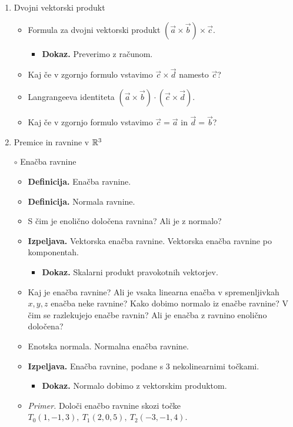 \begin{enumerate}
    \item Dvojni vektorski produkt
    \begin{itemize}
        \item Formula za dvojni vektorski produkt $(\vec{a} \times \vec{b}) \times \vec{c}$.
        \begin{itemize}
            \item \colorbox{green!30}{\textbf{Dokaz.}} Preverimo z računom.
        \end{itemize}
        \item Kaj če v zgornjo formulo vstavimo $\vec{c} \times \vec{d}$ namesto $\vec{c}$?
        \item Langrangeeva identiteta $(\vec{a} \times \vec{b}) \cdot (\vec{c} \times \vec{d})$.
        \item Kaj če v zgornjo formulo vstavimo $\vec{c} = \vec{a}$ in $\vec{d} = \vec{b}$?
    \end{itemize}

    \item Premice in ravnine v $\mathbb{R}^3$
    \item[$\circ$] Enačba ravnine
    \begin{itemize}
        \item \colorbox{purple!30}{\textbf{Definicija.}} Enačba ravnine. 
        \item \colorbox{purple!30}{\textbf{Definicija.}} Normala ravnine.
        \item S čim je enolično določena ravnina? Ali je z normalo?
        \item \colorbox{blue!30}{\textbf{Izpeljava.}} Vektorska enačba ravnine. Vektorska enačba ravnine po komponentah.
        \begin{itemize}
            \item \colorbox{green!30}{\textbf{Dokaz.}} Skalarni produkt pravokotnih vektorjev.
        \end{itemize}
        \item Kaj je enačba ravnine? Ali je vsaka linearna enačba v spremenljivkah $x, y, z$ enačba neke ravnine? Kako dobimo normalo iz enačbe ravnine? V čim se razlekujejo enačbe ravnin? Ali je enačba z ravnino enolično določena?
        \item Enotska normala. Normalna enačba ravnine.
        \item \colorbox{blue!30}{\textbf{Izpeljava.}} Enačba ravnine, podane s 3 nekolinearnimi točkami.
        \begin{itemize}
            \item \colorbox{green!30}{\textbf{Dokaz.}} Normalo dobimo z vektorskim produktom.
        \end{itemize}
        \item \colorbox{yellow!30}{\emph{Primer.}} Določi enačbo ravnine skozi točke $T_0(1, -1, 3), \ T_1(2,0,5), \ T_2(-3, -1, 4)$.
    \end{itemize}


\end{enumerate}

